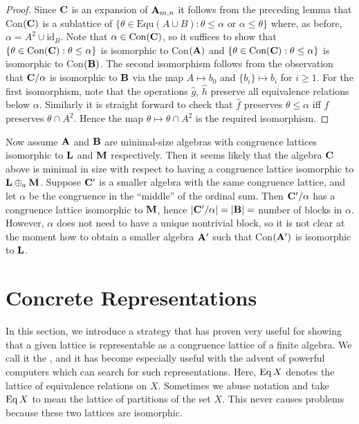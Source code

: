 \begin{proof}
  Since $\mathbf C$ is an expansion of $\mathbf A_{m,n}$ it follows from the preceding lemma
  that Con$(\mathbf C)$ is a sublattice of 
  $\{\theta\in \text{Equ}(A\cup B):\theta\le\alpha$ or $\alpha\le\theta\}$ where,
  as before, $\alpha=A^2\cup\text{id}_B$. Note that $\alpha\in\text{Con}(\mathbf C)$,
  so it suffices to show that $\{\theta\in\text{Con}(\mathbf C):\theta\le\alpha\}$ is
  isomorphic to Con$(\mathbf A)$ and $\{\theta\in\text{Con}(\mathbf C):\theta\le\alpha\}$ 
  is isomorphic to Con$(\mathbf B)$. The second isomorphism follows from the
  observation that $\mathbf C/\alpha$ is isomorphic to $\mathbf B$ via the map 
  $A\mapsto b_0$ and $\{b_i\}\mapsto b_i$ for $i\ge 1$. For the first isomorphism,
  note that the operations $\hat g$, $\hat h$ preserve all equivalence relations
  below $\alpha$. Similarly it is straight forward to check that $\hat f$
  preserves $\theta\le\alpha$ iff $f$ preserves $\theta\cap A^2$. 
  Hence the map $\theta\mapsto\theta\cap A^2$ is the required isomorphism.
\end{proof}

Now assume $\mathbf A$ and $\mathbf B$ are minimal-size algebras with congruence lattices
isomorphic to $\mathbf L$ and $\mathbf M$ respectively. Then it seems likely that the
algebra $\mathbf C$ above is minimal in size with respect to having a congruence
lattice isomorphic to $\mathbf L\oplus_a\mathbf M$. Suppose $\mathbf C'$ is a smaller algebra
with the same congruence lattice, and let $\alpha$ be the congruence in the
``middle'' of the ordinal sum. Then $\mathbf C'/\alpha$ has a congruence lattice
isomorphic to $\mathbf M$, hence $|\mathbf C'/\alpha|=|\mathbf B|=$ number of blocks in
$\alpha$. However, $\alpha$ does not need to have a unique nontrivial block, so
it is not clear at the moment how to obtain a smaller algebra $\mathbf A'$ such that
Con$(\mathbf A')$ is isomorphic to $\mathbf L$. 



\section{Concrete Representations}
\label{sec:concr-repr}

In this section, we introduce a strategy that has proven very useful for showing
that a given lattice is representable as a congruence lattice of a finite
algebra. We call it the , and it has become especially
useful with the advent of powerful computers which can search for such
representations.  Here,  $\operatorname{Eq} X$ denotes the lattice of equivalence
relations on $X$. Sometimes we abuse notation and take $\operatorname{Eq} X$ to mean the
lattice of partitions of the set $X$. This never causes problems because these
two lattices are isomorphic.  

